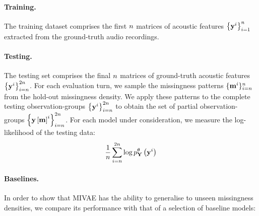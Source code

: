 \documentclass[../thesis.tex]{subfiles}
\begin{document}
\paragraph{Training.} The training dataset comprises the first $n$ matrices of acoustic features $\left\{\mathbf{{y}}^i\right\}_{i=1}^{n}$ extracted from the ground-truth audio recordings.



\paragraph{Testing.} The testing set comprises the final $n$ matrices of ground-truth acoustic features $\left\{\mathbf{{y}}^i\right\}_{i=n}^{2 n}$. For each evaluation turn, we sample the missingness patterns $\{\mathbf{{m}}^{i}\}_{i =n}^{n}$ from the hold-out missingness density. We apply these patterns to the complete testing observation-groups $\left\{\mathbf{{y}}^i\right\}_{i=n}^{2 n}$ to obtain the set of partial observation-groups $\left\{\mathbf{{y}} \left[ \mathbf{{m}} \right]^i \right\}_{i = n}^{2n}$. For each model under consideration, we measure the log-likelihood of the testing data: 
\[
    \frac{1}{\mycnt{n}} \sum_{i=\mycnt{n}}^{2 \mycnt{n}} \log \myfunc{p}^{\theta}_{\mygroup{\myrv{y}}} \left( \mygroup{\myvect{y}}^i \right)
\]

\paragraph{Baselines.} In order to show that MIVAE has the ability to generalise to unseen missingness densities, we compare its performance with that of a selection of baseline models:

\end{document}

